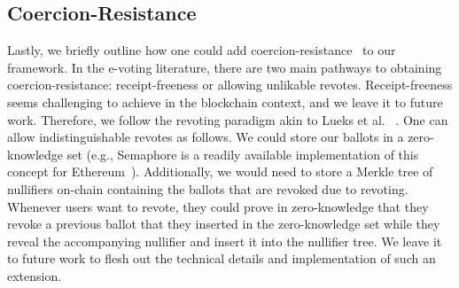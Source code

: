 \subsection{Coercion-Resistance}\label{sec:extension_coercion_resistance}
Lastly, we briefly outline how one could add coercion-resistance~\cite{WPES:JueCatJak05} to our framework. In the e-voting literature, there are two main pathways to obtaining coercion-resistance: receipt-freeness or allowing unlikable revotes. Receipt-freeness seems challenging to achieve in the blockchain context, and we leave it to future work.  Therefore, we follow the revoting paradigm akin to Lueks et al. ~\cite{USENIX:LueQueTro20}. One can allow indistinguishable revotes as follows. We could store our ballots in a zero-knowledge set (e.g., Semaphore is a readily available implementation of this concept for Ethereum~\cite{semaphore}). Additionally, we would need to store a Merkle tree of nullifiers on-chain containing the ballots that are revoked due to revoting. Whenever users want to revote, they could prove in zero-knowledge that they revoke a previous ballot that they inserted in the zero-knowledge set while they reveal the accompanying nullifier and insert it into the nullifier tree. We leave it to future work to flesh out the technical details and implementation of such an extension.



